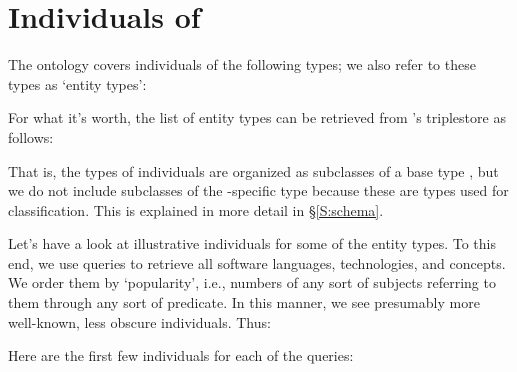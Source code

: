 
\section{Individuals of \solasote}
\label{S:entities}

The ontology covers individuals of the following types; we also refer
to these types as `entity types':


\noindent
For what it's worth, the list of entity types can be retrieved from
\solasote's triplestore as follows:


\noindent
That is, the types of individuals are organized as subclasses of a
base type , but we do not include subclasses of the
\solasote-specific type  because these are types
used for classification. This is explained in more detail in
\S\ref{S:schema}.

Let's have a look at illustrative individuals for some of the entity types. To this end, we use queries to retrieve all software languages, technologies, and concepts. We order them by `popularity', i.e., numbers of any sort of subjects referring to them through any sort of predicate. In this manner, we see presumably more well-known, less obscure individuals. Thus:




\noindent
Here are the first few individuals for each of the queries:




